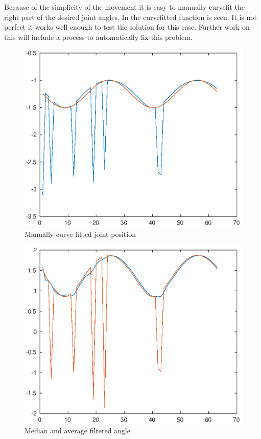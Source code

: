 Because of the simplicity of the movement it is easy to manually curvefit the right part of the desired joint angles. In  the curvefitted function is seen. It is not perfect it works well enough to test the solution for this case. Further work on this will include a process to automatically fix this problem. 


\begin{figure}[htbp]
  \centering
  \includegraphics[width=.9\textwidth]{img/manCurvfit.eps}
  \caption{Manually curve fitted joint position}
  \label{fig:manCur}
\end{figure}



\begin{figure}[htbp]
  \centering
  \includegraphics[width=.9\textwidth]{img/medAvgFilt.eps}
  \caption{Median and average filtered angle}
  \label{fig:manCur}
\end{figure}